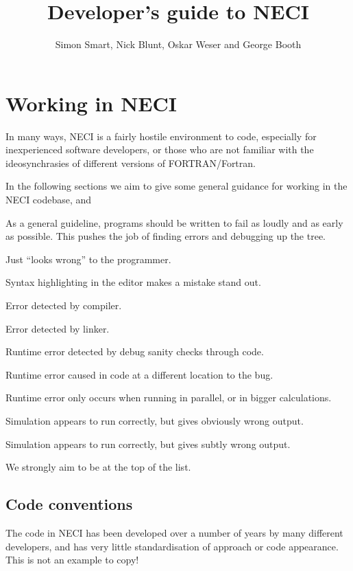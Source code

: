 \documentclass[a4paper,notitlepage,dvipsnames]{scrreprt}
\makeatletter
\newenvironment{packed_enum}{
	\begin{enumerate}
		\setlength{\itemsep}{1pt}
		\setlength{\parskip}{0pt}
		\setlength{\parsep}{0pt}
	}{\end{enumerate}}
\newcommand*{\toccontents}{\@starttoc{toc}}
\makeatother
\begin{document}
\author{Simon Smart, Nick Blunt, Oskar Weser and George Booth}
\title{Developer's guide to NECI}
\maketitle

\toccontents
\chapter{Working in NECI}
In many ways, NECI is a fairly hostile environment to code, especially for
inexperienced software developers, or those who are not familiar with the
ideosynchrasies of different versions of FORTRAN/Fortran.

In the following sections we aim to give some general guidance for working in
the NECI codebase, and

\begin{mdframed}[ %
	linewidth = 2pt, %
	linecolor = red, %
	roundcorner = 6pt, %
	leftmargin = 10, %
	rightmargin = 10, %
	backgroundcolor = gray!20
]
As a general guideline, programs should be written to fail as loudly and as
early as possible. This pushes the job of finding errors and debugging up
the tree.

\begin{packed_enum}
	\item Just ``looks wrong'' to the programmer.
	\item Syntax highlighting in the editor makes a mistake stand out.
	\item Error detected by compiler.
	\item Error detected by linker.
	\item Runtime error detected by debug sanity checks through code.
	\item Runtime error caused in code at a different location to the bug.
	\item
		Runtime error only occurs when running in parallel, or in bigger
		calculations.
	\item
		Simulation appears to run correctly, but gives obviously wrong output.
	\item
		Simulation appears to run correctly, but gives subtly wrong output.
\end{packed_enum}
We strongly aim to be at the top of the list.
\end{mdframed}

\section{Code conventions}
\label{sec:code_conv}
The code in NECI has been developed over a number of years by many different
developers, and has very little standardisation of approach or code appearance.
This is not an example to copy!
\end{document}
